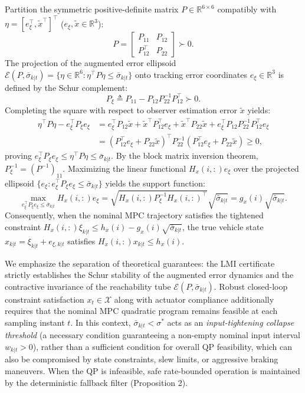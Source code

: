\documentclass[journal]{IEEEtran}
\begin{document}
\begin{IEEEproof}
Partition the symmetric positive-definite matrix $P \in \mathbb{R}^{6 \times 6}$ compatibly with $\eta = [e_\xi^\top, \tilde x^\top]^\top$ ($e_\xi, \tilde x \in \mathbb{R}^3$):
\begin{equation}
P = \begin{bmatrix} P_{11} & P_{12} \\ P_{12}^\top & P_{22} \end{bmatrix} \succ 0.
\end{equation}
The projection of the augmented error ellipsoid $\mathcal{E}(P, \bar\sigma_{k|t}) = \{\eta \in \mathbb{R}^6 : \eta^\top P \eta \le \bar\sigma_{k|t}\}$ onto tracking error coordinates $e_\xi \in \mathbb{R}^3$ is defined by the Schur complement:
\begin{equation}
P_\xi \triangleq P_{11} - P_{12} P_{22}^{-1} P_{12}^\top \succ 0.
\end{equation}
Completing the square with respect to observer estimation error $\tilde x$ yields:
\begin{align}
\eta^\top P \eta - e_\xi^\top P_\xi e_\xi &= e_\xi^\top P_{12} \tilde x + \tilde x^\top P_{12}^\top e_\xi + \tilde x^\top P_{22} \tilde x + e_\xi^\top P_{12} P_{22}^{-1} P_{12}^\top e_\xi \nonumber \\
&= (P_{12}^\top e_\xi + P_{22} \tilde x)^\top P_{22}^{-1} (P_{12}^\top e_\xi + P_{22} \tilde x) \ge 0,
\end{align}
proving $e_\xi^\top P_\xi e_\xi \le \eta^\top P \eta \le \bar\sigma_{k|t}$. By the block matrix inversion theorem, $P_\xi^{-1} = (P^{-1})_{11}$. Maximizing the linear functional $H_x(i,:) e_\xi$ over the projected ellipsoid $\{e_\xi : e_\xi^\top P_\xi e_\xi \le \bar\sigma_{k|t}\}$ yields the support function:
\begin{equation}
\max_{e_\xi^\top P_\xi e_\xi \le \bar\sigma_{k|t}} H_x(i,:) e_\xi = \sqrt{H_x(i,:) P_\xi^{-1} H_x(i,:)^\top} \sqrt{\bar\sigma_{k|t}} = g_x(i) \sqrt{\bar\sigma_{k|t}}.
\end{equation}
Consequently, when the nominal MPC trajectory satisfies the tightened constraint $H_x(i,:) \xi_{k|t} \le h_x(i) - g_x(i) \sqrt{\bar\sigma_{k|t}}$, the true vehicle state $x_{k|t} = \xi_{k|t} + e_{\xi,k|t}$ satisfies $H_x(i,:) x_{k|t} \le h_x(i)$.

We emphasize the separation of theoretical guarantees: the LMI certificate strictly establishes the Schur stability of the augmented error dynamics and the contractive invariance of the reachability tube $\mathcal{E}(P, \bar\sigma_{k|t})$. Robust closed-loop constraint satisfaction $x_t \in \mathcal{X}$ along with actuator compliance additionally requires that the nominal MPC quadratic program remains feasible at each sampling instant $t$. In this context, $\bar\sigma_{k|t} < \sigma^*$ acts as an \emph{input-tightening collapse threshold} (a necessary condition guaranteeing a non-empty nominal input interval $w_{k|t} > 0$), rather than a sufficient condition for overall QP feasibility, which can also be compromised by state constraints, slew limits, or aggressive braking maneuvers. When the QP is infeasible, safe rate-bounded operation is maintained by the deterministic fallback filter (Proposition 2).
\end{IEEEproof}
\end{document}
